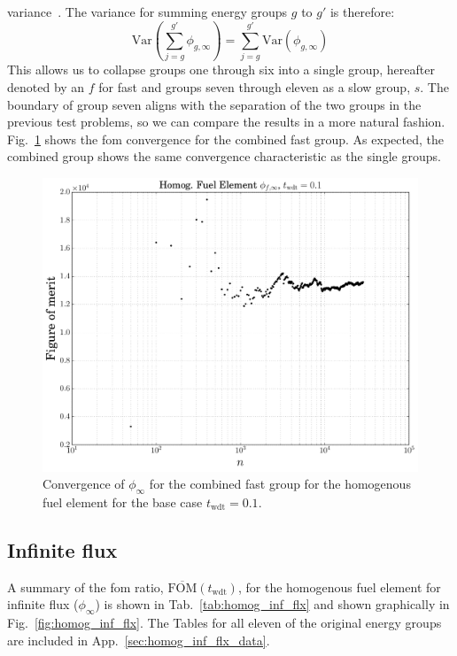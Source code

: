 variance~\cite{taylor1997}. The variance for summing energy groups $g$ to $g'$ is therefore:
\begin{equation*}
  \mathrm{Var}\left( \sum_{j=g}^{g'}\phi_{g,\infty}\right) =   \sum_{j=g}^{g'}\mathrm{Var}\left(\phi_{g,\infty}\right)
\end{equation*}
This allows us to collapse groups one through six into a single group,
hereafter denoted by an $f$ for fast and groups seven through eleven as
 a slow group, $s$. The boundary of group seven aligns with the separation
of the two groups in the previous test problems, so we can compare the
results in a more natural
fashion. Fig.~\ref{fig:homog_fom_convergence_example} shows the
\gls{fom} convergence for the combined fast group. As expected, the
combined group shows the same convergence characteristic as the single
groups.

\begin{figure}[hbtp]
  \centering
  \includegraphics[scale=0.5]{images/homog_fom_convergence_example}
  \caption{Convergence of $\phi_{\infty}$ for the combined fast group
    for the homogenous fuel element for the base case
    $t_{\mathrm{wdt}} = 0.1$.}
  \label{fig:homog_fom_convergence_example}
\end{figure}

\subsection{Infinite flux}
\label{sec:homog_inf_flx}

A summary of the \gls{fom} ratio,
$\overline{\mathrm{FOM}}(t_{\mathrm{wdt}})$, for the homogenous fuel
element for infinite flux ($\phi_{\infty}$) is shown in
Tab.~\ref{tab:homog_inf_flx} and shown graphically in
Fig.~\ref{fig:homog_inf_flx}. The Tables for all eleven of the
original energy groups are included in
App.~\ref{sec:homog_inf_flx_data}.

